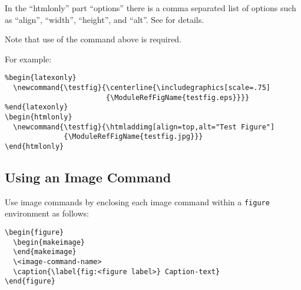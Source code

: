 \documentclass[11pt]{article}
\newcommand{\latexenv}[1]{\texttt{#1}}
\begin{document}
In the ``htmlonly'' part ``options'' there is a comma separated list of options
such as ``align'', ``width'', ``height'', and ``alt''.  See  for details.

Note that use of the  command above is
required.

For example:
%
\begin{verbatim}
%begin{latexonly}
  \newcommand{\testfig}{\centerline{\includegraphics[scale=.75]
                        {\ModuleRefFigName{testfig.eps}}}}
%end{latexonly}
\begin{htmlonly}
  \newcommand{\testfig}{\htmladdimg[align=top,alt="Test Figure"]
              {\ModuleRefFigName{testfig.jpg}}}
\end{htmlonly}
\end{verbatim}




\subsection{Using an Image Command}
\label{sec:useimgcmd}

Use image commands by enclosing each image
command within a \latexenv{figure} environment as follows:

\begin{verbatim}
\begin{figure}
  \begin{makeimage}
  \end{makeimage}
  \<image-command-name>
  \caption{\label{fig:<figure label>} Caption-text}
\end{figure}
\end{verbatim}

\end{document}
